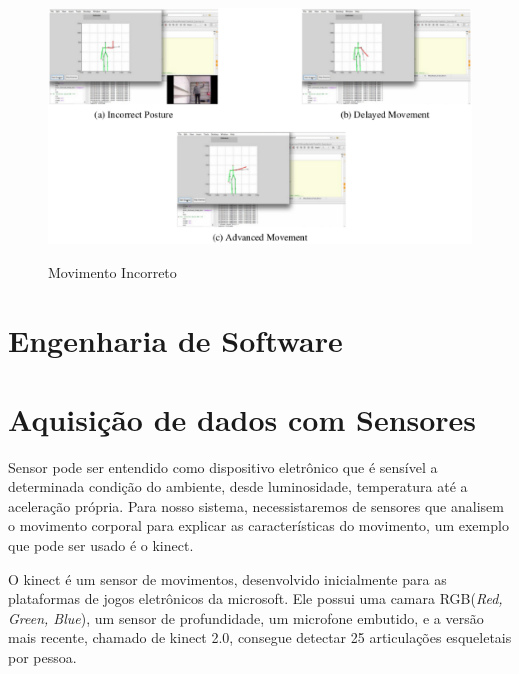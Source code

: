 \begin{figure}[!h]                                                             
\centering                                                                     
\includegraphics [keepaspectratio=true,scale=0.60]{figuras/movimentoIncorreto.eps}
                       
\caption{Movimento Incorreto}                                                     
\cite{roberto}                                                       
\label{movimentoIncorreto}                                                        
\end{figure}                                                                   



\section{Engenharia de Software}
\label{Sec:ContextoESW}

\section{Aquisição de dados com Sensores}
\label{Sec:Aquisição de dados com sensores}

  Sensor pode ser entendido como dispositivo eletrônico que é sensível a determinada
condição do ambiente, desde luminosidade, temperatura até a aceleração própria.
Para nosso sistema, necessistaremos de sensores que analisem o movimento corporal
para explicar as características do movimento, um exemplo que pode ser usado é o
kinect.

  O kinect é um sensor de movimentos, desenvolvido inicialmente para as plataformas
de jogos eletrônicos da microsoft. Ele possui uma camara RGB(\textit{Red, Green, Blue}),
um sensor de profundidade, um microfone embutido, e a versão mais recente, chamado de kinect 2.0, 
consegue detectar 25 articulações esqueletais por pessoa.

